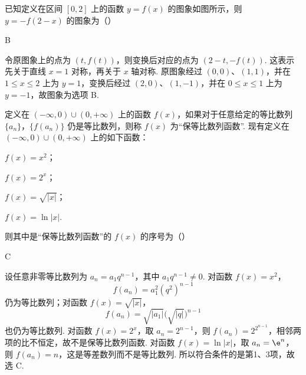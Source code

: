 \begin{problem}
已知定义在区间 \([0,2]\) 上的函数 \(y=f(x)\) 的图象如图所示，则 \(y=-f(2-x)\) 的图象为（\quad）


    {}
    {}
    {}
\end{problem}

\begin{answer}
B
\end{answer}

\begin{solution}
令原图象上的点为 \((t,f(t))\)，则变换后对应的点为 \((2-t,-f(t))\). 这表示先关于直线 \(x=1\) 对称，再关于 \(x\) 轴对称. 原图象经过 \((0,0)\)、\((1,1)\)，并在 \(1\leqslant x\leqslant2\) 上为 \(y=1\)，变换后经过 \((2,0)\)、\((1,-1)\)，并在 \(0\leqslant x\leqslant1\) 上为 \(y=-1\)，故图象为选项 B.
\end{solution}

\begin{problem}
定义在 \((- \infty, 0) \cup (0, +\infty)\) 上的函数 \(f(x)\)，如果对于任意给定的等比数列 \(\{a_{n}\}\)，\(\{f(a_{n})\}\) 仍是等比数列，则称 \(f(x)\) 为“保等比数列函数”. 现有定义在 \((- \infty, 0) \cup (0, +\infty)\) 上的如下函数：
\begin{circlelist}
\item \( f(x)=x^{2} \)；
\item \( f(x)=2^{x} \)；
\item \( f(x)=\sqrt{|x|} \)；
\item \( f(x)=\ln|x| \).
\end{circlelist}
则其中是“保等比数列函数”的 \( f(x) \) 的序号为（\quad）

\choices
    {}
    {}
    {}
    {}
\end{problem}

\begin{answer}
C
\end{answer}

\begin{solution}
设任意非零等比数列为 \(a_n=a_1q^{n-1}\)，其中 \(a_1q^{n-1}\neq0\). 对函数 \(f(x)=x^{2}\)，
\[
f(a_n)=a_1^{2}(q^{2})^{n-1}
\]
仍为等比数列；对函数 \(f(x)=\sqrt{|x|}\)，
\[
f(a_n)=\sqrt{|a_1|}\bigl(\sqrt{|q|}\bigr)^{n-1}
\]
也仍为等比数列. 对函数 \(f(x)=2^{x}\)，取 \(a_n=2^{n-1}\)，则 \(f(a_n)=2^{2^{n-1}}\)，相邻两项的比不恒定，故不是保等比数列函数. 对函数 \(f(x)=\ln|x|\)，取 \(a_n=\e^{n}\)，则 \(f(a_n)=n\)，这是等差数列而不是等比数列. 所以符合条件的是第1、3项，故选 C.
\end{solution}

